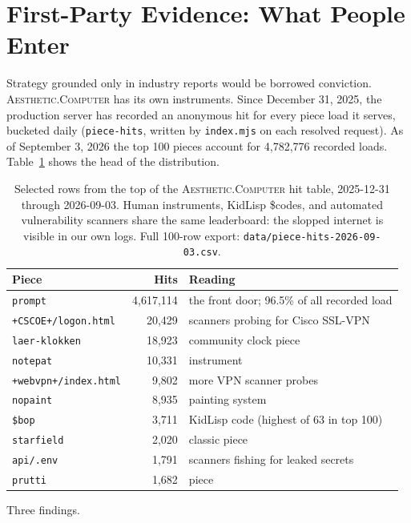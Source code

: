 \documentclass[10pt,letterpaper,twocolumn]{article}
\newcommand{\ac}{\textsc{Aesthetic.Computer}}
\begin{document}
\section{First-Party Evidence: What People Enter}

Strategy grounded only in industry reports would be borrowed conviction. \ac{} has its own instruments. Since December 31, 2025, the production server has recorded an anonymous hit for every piece load it serves, bucketed daily (\texttt{piece-hits}, written by \texttt{index.mjs} on each resolved request). As of September 3, 2026 the top 100 pieces account for 4{,}782{,}776 recorded loads. Table~\ref{tab:hits} shows the head of the distribution.

\begin{table}[t]
\centering
\small
\begin{tabularx}{\columnwidth}{@{}l r >{\raggedright\arraybackslash}X@{}}
\toprule
\textbf{Piece} & \textbf{Hits} & \textbf{Reading} \\
\midrule
\texttt{prompt} & 4{,}617{,}114 & the front door; 96.5\% of all recorded load \\
\texttt{+CSCOE+/logon.html} & 20{,}429 & scanners probing for Cisco SSL-VPN \\
\texttt{laer-klokken} & 18{,}923 & community clock piece \\
\texttt{notepat} & 10{,}331 & instrument~\citep{scudder2026notepat} \\
\texttt{+webvpn+/index.html} & 9{,}802 & more VPN scanner probes \\
\texttt{nopaint} & 8{,}935 & painting system \\
\texttt{\$bop} & 3{,}711 & KidLisp code (highest of 63 in top 100) \\
\texttt{starfield} & 2{,}020 & classic piece \\
\texttt{api/.env} & 1{,}791 & scanners fishing for leaked secrets \\
\texttt{prutti} & 1{,}682 & piece \\
\bottomrule
\end{tabularx}
\caption{Selected rows from the top of the \ac{} hit table, 2025-12-31 through 2026-09-03. Human instruments, KidLisp \$codes, and automated vulnerability scanners share the same leaderboard: the slopped internet is visible in our own logs. Full 100-row export: \texttt{data/piece-hits-2026-09-03.csv}.}
\label{tab:hits}
\end{table}

Three findings.
\end{document}
